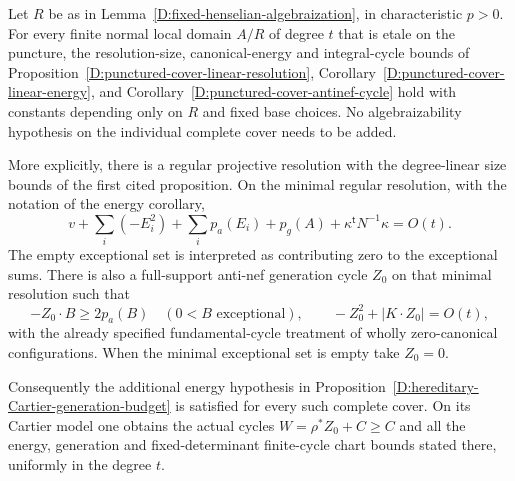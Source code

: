 \begin{proposition}
\label{D:all-complete-cover-geometric-budgets}
Let $R$ be as in Lemma~\ref{D:fixed-henselian-algebraization},
in characteristic $p>0$. For every finite normal local
domain $A/R$ of degree $t$ that is etale on the puncture,
the resolution-size, canonical-energy and integral-cycle
bounds of
Proposition~\ref{D:punctured-cover-linear-resolution},
Corollary~\ref{D:punctured-cover-linear-energy}, and
Corollary~\ref{D:punctured-cover-antinef-cycle}
hold with constants depending only on $R$ and fixed base
choices. No algebraizability hypothesis on the individual
complete cover needs to be added.

More explicitly, there is a regular projective resolution
with the degree-linear size bounds of the first cited
proposition. On the minimal regular resolution, with the
notation of the energy corollary,
\[
 v+\sum_i(-E_i^2)+\sum_i p_a(E_i)+p_g(A)
                +\kappa^{\mathsf t}N^{-1}\kappa=O(t).
                                                               \tag{D.AC.3}
\]
The empty exceptional set is interpreted as contributing
zero to the exceptional sums. There is also a full-support
anti-nef generation cycle $Z_0$ on that minimal resolution
such that
\[
 -Z_0\cdot B\ge2p_a(B)\quad(0<B\text{ exceptional}),
 \qquad -Z_0^2+|K\cdot Z_0|=O(t),                    \tag{D.AC.4}
\]
with the already specified fundamental-cycle treatment
of wholly zero-canonical configurations. When the minimal
exceptional set is empty take $Z_0=0$.

Consequently the additional energy hypothesis in
Proposition~\ref{D:hereditary-Cartier-generation-budget}
is satisfied for every such complete cover. On its
Cartier model one obtains the actual cycles
$W=\rho^*Z_0+C\ge C$ and all the energy, generation and
fixed-determinant finite-cycle chart bounds stated there,
uniformly in the degree $t$.
\end{proposition}

